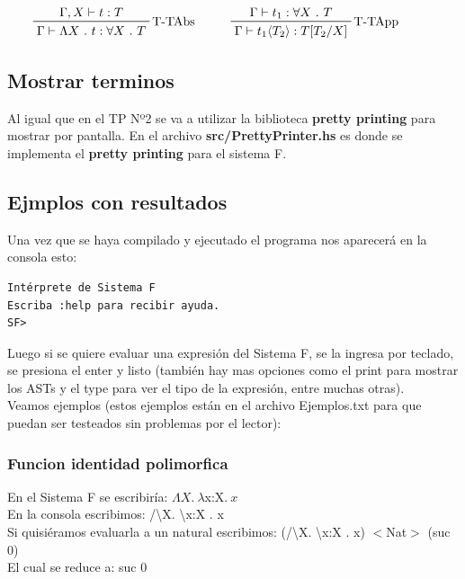 \documentclass[12pt, titlepage, a4paper]{article}
\begin{document}
\begin{displaymath}
    \prftree[r]{T-TAbs}{\Gamma, X \vdash t : T}{\Gamma \vdash \Lambda X \ . \ t : \forall X \ . \ T} \hspace{1cm}
    \prftree[r]{T-TApp}{\Gamma \vdash t_1 : \forall X \ . \ T}{\Gamma \vdash t_1 \langle T_2 \rangle : T[T_2/X]} \hspace{1cm}
\end{displaymath}

\subsection{Mostrar terminos}
Al igual que en el TP Nº2 \cite{tp2:lambdaCalculoSimpleTipado} se va a utilizar la biblioteca \textbf{pretty printing} para mostrar por 
pantalla. En el archivo
\textbf{src/PrettyPrinter.hs} es donde se implementa el \textbf{pretty printing} para el sistema F.

\subsection{Ejmplos con resultados}
Una vez que se haya compilado y ejecutado el programa nos aparecerá en la consola esto:

\begin{verbatim}
Intérprete de Sistema F
Escriba :help para recibir ayuda.
SF>
\end{verbatim}

Luego si se quiere evaluar una expresión del Sistema F, se la ingresa por teclado, se presiona el enter y listo 
(también hay mas opciones como el print para mostrar los ASTs y el type para ver el tipo de la expresión, entre muchas otras). \\

Veamos ejemplos (estos ejemplos están en el archivo Ejemplos.txt para que puedan ser testeados sin problemas por el lector):

\subsubsection{Funcion identidad polimorfica}
\noindent En el Sistema F se escribiría: $\Lambda X.\ \lambda $x:X$. \ x$ \\
En la consola escribimos: /\textbackslash X. \textbackslash x:X . x \\
Si quisiéramos evaluarla a un natural escribimos: (/\textbackslash X. \textbackslash x:X . x)  $<$Nat$>$ (suc 0) \\
El cual se reduce a: suc 0
\end{document}
